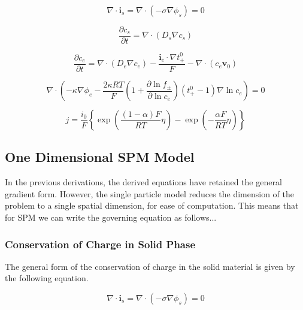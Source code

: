 \documentclass[lettersize,journal]{IEEEtran}
\begin{document}
\begin{equation} \label{COC_s}
\nabla \cdot \mathbf{i}_{s}=\nabla \cdot\left(-\sigma \nabla \phi_{s}\right)=0
\end{equation}

\begin{equation} \label{COM_s}
\frac{\partial c_{s}}{\partial t}=\nabla \cdot\left(D_{s} \nabla c_{s}\right)
\end{equation}

\begin{equation} \label{COM_e}
\frac{\partial c_{e}}{\partial t}=\nabla \cdot\left(D_{e} \nabla c_{e}\right)-\frac{\mathbf{i}_{e} \cdot \nabla t_{+}^{0}}{F}-\nabla \cdot\left(c_{e} \mathbf{v}_{0}\right)
\end{equation}

\begin{equation}\label{COC_e}
\nabla \cdot\left(-\kappa \nabla \phi_{e}-\frac{2 \kappa R T}{F}\left(1+\frac{\partial \ln f_{\pm}}{\partial \ln c_{e}}\right)\left(t_{+}^{0}-1\right) \nabla \ln c_{e}\right)=0
\end{equation}

\begin{equation} \label{lithium_movment}
j=\frac{i_{0}}{F}\left\{\exp \left(\frac{(1-\alpha) F}{R T} \eta\right)-\exp \left(-\frac{\alpha F}{R T} \eta\right)\right\}
\end{equation}


\subsection{One Dimensional SPM Model}

In the previous derivations, the derived equations have retained the general gradient form. However, the single particle model reduces the dimension of the problem to a single spatial dimension, for ease of computation. This means that for SPM we can write the governing equation as follows... \\

\subsubsection{Conservation of Charge in Solid Phase}

The general form of the conservation of charge in the solid material is given by the following equation.

\begin{equation}
\nabla \cdot \mathbf{i}_{s}=\nabla \cdot\left(-\sigma \nabla \phi_{s}\right)=0
\end{equation}
\end{document}
